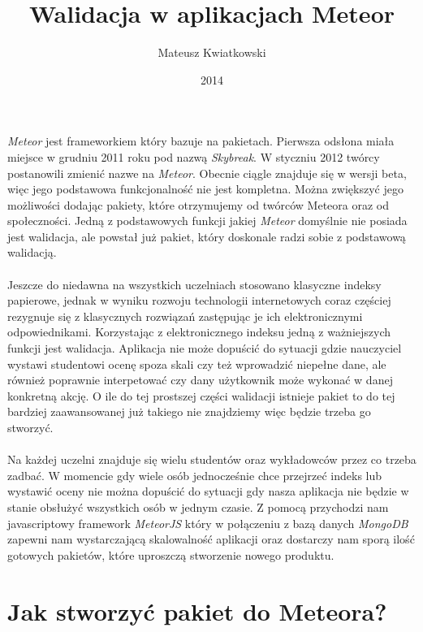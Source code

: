 \documentclass[brudnopis]{xmgr}
\author   {Mateusz Kwiatkowski}
\title    {Walidacja w aplikacjach Meteor}
\date     {2014}
\begin{document}
\begin{abstract}
\end{abstract}

\maketitle
%
\introduction

\textit{Meteor} jest frameworkiem który bazuje na pakietach. Pierwsza odsłona miała miejsce w grudniu 2011 roku pod nazwą \textit{Skybreak}.
W styczniu 2012 twórcy postanowili zmienić nazwe na \textit{Meteor}. Obecnie ciągle znajduje się w wersji beta, więc jego
podstawowa funkcjonalność nie jest kompletna. Można zwiększyć jego możliwości dodając pakiety, które otrzymujemy
od twórców Meteora oraz od społeczności.
Jedną z podstawowych funkcji jakiej \textit{Meteor} domyślnie nie posiada jest walidacja, ale powstał już pakiet, który doskonale radzi
sobie z podstawową walidacją.
\\
\\
Jeszcze do niedawna na wszystkich uczelniach stosowano klasyczne indeksy
papierowe, jednak w wyniku rozwoju technologii internetowych coraz częściej
rezygnuje się z klasycznych rozwiązań zastępując je ich elektronicznymi odpowiednikami.
Korzystając z elektronicznego indeksu jedną z ważniejszych funkcji jest walidacja. Aplikacja nie może dopuścić do
sytuacji gdzie nauczyciel wystawi studentowi ocenę spoza skali czy też wprowadzić niepełne dane, ale również
poprawnie interpetować czy dany użytkownik może wykonać w danej konkretną akcję. O ile do tej prostszej części
walidacji istnieje pakiet to do tej bardziej zaawansowanej już takiego nie znajdziemy więc będzie trzeba go stworzyć.
\\
\\
Na każdej uczelni znajduje się wielu studentów oraz wykładowców przez co trzeba zadbać. W momencie
gdy wiele osób jednocześnie chce przejrzeć indeks lub wystawić oceny nie można dopuścić do sytuacji gdy nasza
aplikacja nie będzie w stanie obsłużyć wszystkich osób w jednym czasie. Z pomocą przychodzi nam javascriptowy
framework \textit{MeteorJS} który w połączeniu z bazą danych \textit{MongoDB} zapewni nam wystarczającą skalowalność
aplikacji oraz dostarczy nam sporą ilość gotowych pakietów, które uproszczą stworzenie nowego produktu.




\chapter{Jak stworzyć pakiet do Meteora?}
\end{document}
